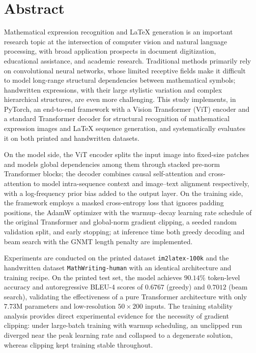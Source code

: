 \section*{Abstract}

Mathematical expression recognition and LaTeX generation is an important research topic at the intersection of computer vision and natural language processing, with broad application prospects in document digitization, educational assistance, and academic research.
Traditional methods primarily rely on convolutional neural networks, whose limited receptive fields make it difficult to model long-range structural dependencies between mathematical symbols; handwritten expressions, with their large stylistic variation and complex hierarchical structures, are even more challenging.
This study implements, in PyTorch, an end-to-end framework with a Vision Transformer (ViT) encoder and a standard Transformer decoder for structural recognition of mathematical expression images and LaTeX sequence generation, and systematically evaluates it on both printed and handwritten datasets.

On the model side, the ViT encoder splits the input image into fixed-size patches and models global dependencies among them through stacked pre-norm Transformer blocks; the decoder combines causal self-attention and cross-attention to model intra-sequence context and image--text alignment respectively, with a log-frequency prior bias added to the output layer.
On the training side, the framework employs a masked cross-entropy loss that ignores padding positions, the AdamW optimizer with the warmup--decay learning rate schedule of the original Transformer and global-norm gradient clipping, a seeded random validation split, and early stopping; at inference time both greedy decoding and beam search with the GNMT length penalty are implemented.

Experiments are conducted on the printed dataset \texttt{im2latex-100k} and the handwritten dataset \texttt{MathWriting-human} with an identical architecture and training recipe.
On the printed test set, the model achieves $90.14\%$ token-level accuracy and autoregressive BLEU-4 scores of $0.6767$ (greedy) and $0.7012$ (beam search), validating the effectiveness of a pure Transformer architecture with only $7.73$M parameters and low-resolution $50\times200$ inputs.
The training stability analysis provides direct experimental evidence for the necessity of gradient clipping: under large-batch training with warmup scheduling, an unclipped run diverged near the peak learning rate and collapsed to a degenerate solution, whereas clipping kept training stable throughout.

